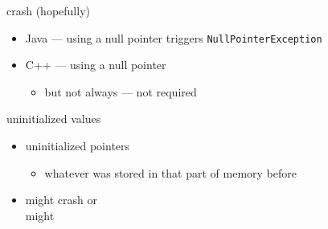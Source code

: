 \begin{frame}[fragile,label=NullErrors]{crash (hopefully)}
\lstset{language=C++,style=small}
    \begin{itemize}
        \item Java --- using a null pointer triggers \texttt{NullPointerException}
        \item C++ --- using a null pointer 
            \begin{itemize}
            \item but not always --- not required
            \end{itemize}
    \end{itemize}
\end{frame}

\begin{frame}[fragile,label=uninitialized]{uninitialized values}
\lstset{language=C++,style=small}
    \begin{itemize}
        \item uninitialized pointers 
            \begin{itemize}
            \item whatever was stored in that part of memory before
            \end{itemize}
        \item might crash or \\ might 
    \end{itemize}
\end{frame}

